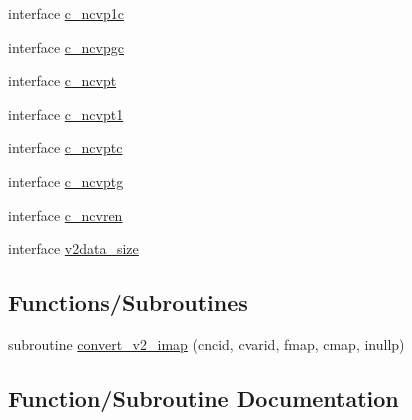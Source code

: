 \begin{DoxyCompactItemize}
\item 
interface \hyperlink{interfacenetcdf__fortv2__c__interfaces_1_1c__ncvp1c}{c\+\_\+ncvp1c}
\item 
interface \hyperlink{interfacenetcdf__fortv2__c__interfaces_1_1c__ncvpgc}{c\+\_\+ncvpgc}
\item 
interface \hyperlink{interfacenetcdf__fortv2__c__interfaces_1_1c__ncvpt}{c\+\_\+ncvpt}
\item 
interface \hyperlink{interfacenetcdf__fortv2__c__interfaces_1_1c__ncvpt1}{c\+\_\+ncvpt1}
\item 
interface \hyperlink{interfacenetcdf__fortv2__c__interfaces_1_1c__ncvptc}{c\+\_\+ncvptc}
\item 
interface \hyperlink{interfacenetcdf__fortv2__c__interfaces_1_1c__ncvptg}{c\+\_\+ncvptg}
\item 
interface \hyperlink{interfacenetcdf__fortv2__c__interfaces_1_1c__ncvren}{c\+\_\+ncvren}
\item 
interface \hyperlink{interfacenetcdf__fortv2__c__interfaces_1_1v2data__size}{v2data\+\_\+size}
\end{DoxyCompactItemize}
\subsection*{Functions/\+Subroutines}
\begin{DoxyCompactItemize}
\item 
subroutine \hyperlink{namespacenetcdf__fortv2__c__interfaces_aa498e7ff4a31dbaf7f7bebad93ca603c}{convert\+\_\+v2\+\_\+imap} (cncid, cvarid, fmap, cmap, inullp)
\end{DoxyCompactItemize}


\subsection{Function/\+Subroutine Documentation}
\mbox{\label{namespacenetcdf__fortv2__c__interfaces_aa498e7ff4a31dbaf7f7bebad93ca603c}} 
